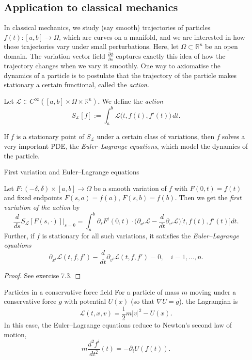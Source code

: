 \subsection{Application to classical mechanics}

In classical mechanics, we study (say smooth) trajectories of particles $f(t):[a,b]\to \Omega$, which are curves on a manifold, and we are interested in how these trajectories vary under small perturbations. Here, let $\Omega \subset \mathbb{R}^n$ be an open domain. The variation vector field $\frac{\partial \phi}{\partial s}$ captures exactly this idea of how the trajectory changes when we vary it smoothly. One way to axiomatise the dynamics of a particle is to postulate that the trajectory of the particle makes stationary a certain functional, called the \emph{action}.

Let $\mathcal{L} \in C^\infty([a,b]\times \Omega \times \mathbb{R}^n)$. We define the \emph{action}
\[
S_{\mathcal{L}}[f] := \int_a^b \mathcal{L}\big(t, f(t), f'(t)\big)\,dt.
\]

If $f$ is a stationary point of $S_{\mathcal{L}}$ under a certain class of variations, then $f$ solves a very important PDE, the \emph{Euler--Lagrange equations}, which model the dynamics of the particle.


\begin{colorlem}{First variation and Euler--Lagrange equations}{}

Let $F:(-\delta,\delta)\times [a,b]\to \Omega$ be a smooth variation of $f$ with
$F(0,t)=f(t)$ and fixed endpoints $F(s,a)=f(a)$, $F(s,b)=f(b)$. Then we get the \emph{first variation of the action} by
\[
\frac{d}{ds} S_{\mathcal{L}}[F(s,\cdot)]\bigg|_{s=0}
=
\int_a^b \partial_s F^i(0,t)\cdot \Big(\partial_{x^i}\mathcal{L} - \frac{d}{dt}\partial_{v^i}\mathcal{L}\Big)
\big[t,f(t),f'(t)\big]dt.
\]
Further, if $f$ is stationary for all such variations, it satisfies the \emph{Euler--Lagrange equations}
\[
\partial_{x^i}\mathcal{L}(t,f,f') - \frac{d}{dt}\partial_{v^i}\mathcal{L}(t,f,f') = 0,
\quad i=1,\dots,n.\tag{EL1}
\]
\end{colorlem}
\begin{proof}
See exercise 7.3.
\end{proof}

\begin{colexample}{Particles in a conservative force field} 
For a particle of mass $m$ moving under a conservative force $g$ with potential $U(x)$ (so that $\nabla U = g$), the Lagrangian is
\[
\mathcal{L}(t,x,v) = \frac{1}{2}m|v|^2 - U(x).
\]
In this case, the Euler--Lagrange equations reduce to Newton's second law of motion,
\[
m\frac{d^2 f^i}{dt^2}(t) = -\partial_i U(f(t)).
\]
\end{colexample}




